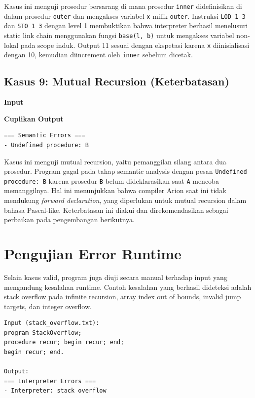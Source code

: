 Kasus ini menguji prosedur bersarang di mana prosedur \texttt{inner} didefinisikan di dalam prosedur \texttt{outer} dan mengakses variabel \texttt{x} milik \texttt{outer}. Instruksi \texttt{LOD 1 3} dan \texttt{STO 1 3} dengan level 1 membuktikan bahwa interpreter berhasil menelusuri static link chain menggunakan fungsi \texttt{base(l, b)} untuk mengakses variabel non-lokal pada scope induk. Output 11 sesuai dengan ekspetasi karena \texttt{x} diinisialisasi dengan 10, kemudian diincrement oleh \texttt{inner} sebelum dicetak.

\subsection{Kasus 9: Mutual Recursion (Keterbatasan)}
\textbf{Input}\par


\textbf{Cuplikan Output}\par
\begin{lstlisting}[basicstyle=\ttfamily\scriptsize,breaklines=true,frame=single,numbers=none]
=== Semantic Errors ===
- Undefined procedure: B
\end{lstlisting}

Kasus ini menguji mutual recursion, yaitu pemanggilan silang antara dua prosedur. Program gagal pada tahap semantic analysis dengan pesan \texttt{Undefined procedure: B} karena prosedur \texttt{B} belum dideklarasikan saat \texttt{A} mencoba memanggilnya. Hal ini menunjukkan bahwa compiler Arion saat ini tidak mendukung \textit{forward declaration}, yang diperlukan untuk mutual recursion dalam bahasa Pascal-like. Keterbatasan ini diakui dan direkomendasikan sebagai perbaikan pada pengembangan berikutnya.

\section{Pengujian Error Runtime}
Selain kasus valid, program juga diuji secara manual terhadap input yang mengandung kesalahan runtime. Contoh kesalahan yang berhasil dideteksi adalah stack overflow pada infinite recursion, array index out of bounds, invalid jump targets, dan integer overflow.

\begin{lstlisting}[basicstyle=\ttfamily\scriptsize,breaklines=true,frame=single,numbers=none]
Input (stack_overflow.txt):
program StackOverflow;
procedure recur; begin recur; end;
begin recur; end.

Output:
=== Interpreter Errors ===
- Interpreter: stack overflow
\end{lstlisting}

